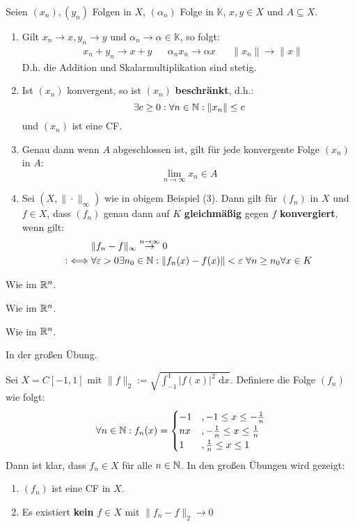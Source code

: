 \documentclass[a4paper,twoside,DIV15,BCOR12mm,chapterprefix=true,headings=twolinechapter]{scrbook}
\begin{document}
\begin{satz}
Seien $(x_n),(y_n)$ Folgen in $X$, $(\alpha_n)$ Folge in $\mathbb{K}$, $x,y\in X$ und
$A\subseteq X$.
\begin{enumerate}
\item Gilt $x_n\to x,y_n\to y$ und $\alpha_n\to\alpha\in\mathbb{K}$, so folgt:
\begin{align*}
&x_n+y_n\to x+y& &\alpha_n x_n\to\alpha x& &\|x_n\|\to\|x\|
\end{align*}
D.h. die Addition und Skalarmultiplikation sind stetig.
\item Ist $(x_n)$ konvergent, so ist $(x_n)$ \textbf{beschränkt}, d.h.:
\[\exists c\ge 0:\forall n\in\mathbb{N}:\|x_n\|\le c\]
und $(x_n)$ ist eine CF.
\item Genau dann wenn $A$ abgeschlossen ist, gilt für jede konvergente Folge $(x_n)$ in $A$:
\[\lim_{n\to\infty}x_n\in A\]
\item Sei $(X,\|\cdot\|_\infty)$ wie in obigem Beispiel (3). Dann gilt für
$(f_n)$ in $X$ und $f\in X$, dass $(f_n)$ genau dann auf $K$ \textbf{gleichmäßig} gegen $f$ 
\textbf{konvergiert}, wenn gilt:
\begin{align*}
&\|f_n-f\|_\infty \stackrel{n\to\infty}{\to}0\\
:\iff &\forall\ep>0\exists n_0\in\MdN:\|f_n(x)-f(x)\|<\ep\ \forall n\ge n_0\forall x\in K
\end{align*}
\end{enumerate}
\end{satz}

\begin{beweise}
\item Wie im $\mathbb{R}^n$.
\item Wie im $\mathbb{R}^n$.
\item Wie im $\mathbb{R}^n$.
\item In der großen Übung.
\end{beweise}

\begin{beispiel}
Sei $X=C[-1,1]$ mit $\|f\|_2:=\sqrt{\int_{-1}^1 |f(x)|^2\text{ d}x}$. Definiere die
Folge $(f_n)$ wie folgt:
\[\forall n\in\mathbb{N}: f_n(x)=
\begin{cases}
-1&,-1\le x\le -\frac1n\\
nx&,-\frac1n\le x\le \frac1n\\
1&,\frac1n\le x\le 1
\end{cases}\]
Dann ist klar, dass $f_n\in X$ für alle $n\in\mathbb{N}$. In den großen Übungen wird gezeigt:
\begin{enumerate}
\item $(f_n)$ ist eine CF in $X$.
\item Es existiert \textbf{kein} $f\in X$ mit $\|f_n-f\|_2\to 0$
\end{enumerate}
\end{beispiel}
\end{document}
